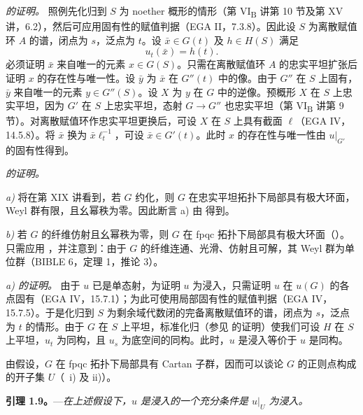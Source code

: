 \smallskip
\noindent\textit{ 的证明。}
照例先化归到 \(S\) 为 noether 概形的情形（第 VI\textsubscript{B} 讲第 10 节及第 XV 讲，6.2），然后可应用固有性的赋值判据（EGA II，7.3.8）。因此设 \(S\) 为离散赋值环 \(A\) 的谱，闭点为 \(s\)，泛点为 \(t\)。设 \(\bar x\in G(t)\) 及 \(h\in H(S)\) 满足
\[
  u_t(\bar x)=h(t).
\]
必须证明 \(\bar x\) 来自唯一的元素 \(x\in G(S)\)。只需在离散赋值环 \(A\) 的忠实平坦扩张后证明 \(x\) 的存在性与唯一性。设 \(\bar y\) 为 \(\bar x\) 在 \(G''(t)\) 中的像。由于 \(G''\) 在 \(S\) 上固有，\(\bar y\) 来自唯一的元素 \(y\in G''(S)\)。设 \(X\) 为 \(y\) 在 \(G\) 中的逆像。预概形 \(X\) 在 \(S\) 上忠实平坦，因为 \(G'\) 在 \(S\) 上忠实平坦，态射 \(G\to G''\) 也忠实平坦（第 VI\textsubscript{B} 讲第 9 节）。对离散赋值环作忠实平坦更换后，可设 \(X\) 在 \(S\) 上具有截面 \(\ell\)（EGA IV，14.5.8）。将 \(\bar x\) 换为 \(\bar x\ell_t^{-1}\)，可设 \(\bar x\in G'(t)\)。此时 \(x\) 的存在性与唯一性由 \(u|_{G'}\) 的固有性得到。

\medskip
\noindent\textit{ 的证明。}

\smallskip
\noindent\textit{a)}
将在第 XIX 讲看到，若 \(G\) 约化，则 \(G\) 在忠实平坦拓扑下局部具有极大环面，Weyl 群有限，且幺幂秩为零。因此断言 a) 由  得到。

\smallskip
\noindent\textit{b)}
若 \(G\) 的纤维仿射且幺幂秩为零，则 \(G\) 在 fpqc 拓扑下局部具有极大环面（）。只需应用 ，并注意到：由于 \(G\) 的纤维连通、光滑、仿射且可解，其 Weyl 群为单位群（BIBLE 6，定理 1，推论 3）。

\medskip
\noindent\textit{ a) 的证明。}
由于 \(u\) 已是单态射，为证明 \(u\) 为浸入，只需证明 \(u\) 在 \(u(G)\) 的各点固有（EGA IV，15.7.1）；为此可使用局部固有性的赋值判据（EGA IV，15.7.5）。于是化归到 \(S\) 为剩余域代数闭的完备离散赋值环的谱，闭点为 \(s\)，泛点为 \(t\) 的情形。由于 \(G\) 在 \(S\) 上平坦，标准化归（参见 的证明）使我们可设 \(H\) 在 \(S\) 上平坦，\(u_t\) 为同构，且 \(u_s\) 为底空间的同构。此时，\(u\) 是浸入等价于 \(u\) 是同构。

由假设，\(G\) 在 fpqc 拓扑下局部具有 Cartan 子群，因而可以谈论 \(G\) 的正则点构成的开子集 \(U\)（~i) 及 ii)）。

\medskip
\noindent{}%
\textbf{引理 1.9。}---\textit{在上述假设下，\(u\) 是浸入的一个充分条件是 \(u|_U\) 为浸入。}

